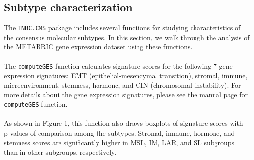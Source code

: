 \documentclass{article}\usepackage[]{graphicx}\usepackage[]{color}
\begin{document}
\subsection{Subtype characterization}
The \texttt{TNBC.CMS} package includes several functions for studying characteristics of the consensus molecular subtypes. In this section, we walk through the analysis of the METABRIC gene expression dataset using these functions.\paragraph{}
The \texttt{computeGES} function calculates signature scores for the following 7 gene expression signatures: EMT (epithelial-mesencymal transition), stromal, immune, microenvironment, stemness, hormone, and CIN (chromosomal instability). For more details about the gene expression signatures, please see the manual page for \texttt{computeGES} function.\paragraph{}
As shown in Figure 1, this function also draws boxplots of signature scores with p-values of comparison among the subtypes. Stromal, immune, hormone, and stemness scores are significantly higher in MSL, IM, LAR, and SL subgroups than in other subgroups, respectively.
\end{document}
